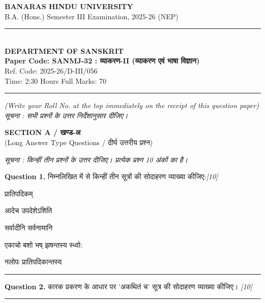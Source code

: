 \documentclass[11pt,a4paper]{article}
\newcommand{\pts}[1]{\hfill \textit{[#1]}}
\begin{document}
\begin{center}
  {\large\bfseries BANARAS HINDU UNIVERSITY}\\[2pt]
  {\normalsize B.A. (Hons.) Semester III Examination, 2025-26 (NEP)}\\[6pt]
  \rule{0.8\linewidth}{0.5pt}\\[6pt]
  {\large\bfseries DEPARTMENT OF SANSKRIT}\\[4pt]
  {\large\bfseries Paper Code: SANMJ-32 : व्याकरण-II (व्याकरण एवं भाषा विज्ञान)}\\[2pt]
  {\small Ref. Code: 2025-26/D-III/056}\\[4pt]
  {\normalsize Time: 2:30 Hours \hfill Full Marks: 70}
\end{center}

\rule{\linewidth}{0.4pt}

\smallskip

\noindent \textit{(Write your Roll No. at the top immediately on the receipt of this question paper)}\\[2pt]
\noindent \textit{सूचना : सभी प्रश्नों के उत्तर निर्देशानुसार दीजिए।}

\bigskip

\begin{center}
  {\large\bfseries SECTION A / खण्ड-अ}\\[2pt]
  {\normalsize (Long Answer Type Questions / दीर्घ उत्तरीय प्रश्न)}
\end{center}

\noindent \textit{सूचना : किन्हीं तीन प्रश्नों के उत्तर दीजिए। प्रत्येक प्रश्न 10 अंकों का है।}\\[2pt]

\bigskip

\noindent \textbf{Question 1.} निम्नलिखित में से किन्हीं तीन सूत्रों की सोदाहरण व्याख्या कीजिए:\pts{10}
\begin{parts}
  \item प्रातिपदिकम्‌
  \item आदेच उपदेशेऽशिति
  \item सर्वादीनि सर्वनामानि
  \item एकाचो बशो भष्‌ झषन्तस्य स्ध्वो:
  \item नलोपः प्रातिपदिकान्तस्य
\end{parts}

\medskip\rule{\linewidth}{0.2pt}\medskip

\noindent \textbf{Question 2.} कारक प्रकरण के आधार पर 'अकथितं च' सूत्र की सोदाहरण व्याख्या कीजिए। \pts{10}

\medskip\rule{\linewidth}{0.2pt}\medskip
\end{document}
